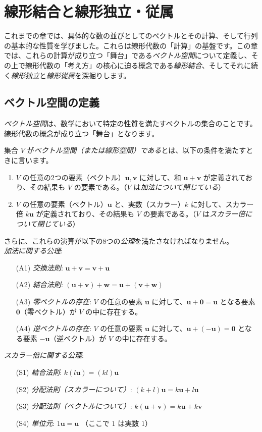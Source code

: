 \section{線形結合と線形独立・従属} \setcounter{ex}{0}

これまでの章では、具体的な数の並びとしてのベクトルとその計算、そして行列の基本的な性質を学びました。これらは線形代数の「計算」の基盤です。この章では、これらの計算が成り立つ「舞台」である\emph{ベクトル空間}について定義し、その上で線形代数の「考え方」の核心に迫る概念である\emph{線形結合}、そしてそれに続く\emph{線形独立}と\emph{線形従属}を深掘りします。

\subsection{ベクトル空間の定義}

\emph{ベクトル空間}は、数学において特定の性質を満たすベクトルの集合のことです。線形代数の概念が成り立つ「舞台」となります。

\begin{dfn}[ベクトル空間] \label{vector_space}
集合 $V$ が\emph{ベクトル空間（または線形空間）である}とは、以下の条件を満たすときに言います。
\begin{enumerate}
\item $V$ の任意の2つの要素（ベクトル）$\bm{u}, \bm{v}$ に対して、和 $\bm{u} + \bm{v}$ が定義されており、その結果も $V$ の要素である。（$V$ は\emph{加法について閉じている}）
\item $V$ の任意の要素（ベクトル）$\bm{u}$ と、実数（スカラー）$k$ に対して、スカラー倍 $k\bm{u}$ が定義されており、その結果も $V$ の要素である。（$V$ は\emph{スカラー倍について閉じている}）
\end{enumerate}
さらに、これらの演算が以下の8つの\emph{公理}を満たさなければなりません。\\
\emph{加法に関する公理}:
\begin{itemize}
\item[(A1)] \emph{交換法則}: $\bm{u} + \bm{v} = \bm{v} + \bm{u}$
\item[(A2)] \emph{結合法則}: $(\bm{u} + \bm{v}) + \bm{w} = \bm{u} + (\bm{v} + \bm{w})$
\item[(A3)] \emph{零ベクトルの存在}: $V$ の任意の要素 $\bm{u}$ に対して、$\bm{u} + \bm{0} = \bm{u}$ となる要素 $\bm{0}$（零ベクトル）が $V$ の中に存在する。
\item[(A4)] \emph{逆ベクトルの存在}: $V$ の任意の要素 $\bm{u}$ に対して、$\bm{u} + (-\bm{u}) = \bm{0}$ となる要素 $-\bm{u}$（逆ベクトル）が $V$ の中に存在する。
\end{itemize}
\emph{スカラー倍に関する公理}:
\begin{itemize}
\item[(S1)] \emph{結合法則}: $k(l\bm{u}) = (kl)\bm{u}$
\item[(S2)] \emph{分配法則（スカラーについて）}: $(k+l)\bm{u} = k\bm{u} + l\bm{u}$
\item[(S3)] \emph{分配法則（ベクトルについて）}: $k(\bm{u}+\bm{v}) = k\bm{u} + k\bm{v}$
\item[(S4)] \emph{単位元}: $1\bm{u} = \bm{u}$ （ここで $1$ は実数 $1$）
\end{itemize}
\end{dfn}

